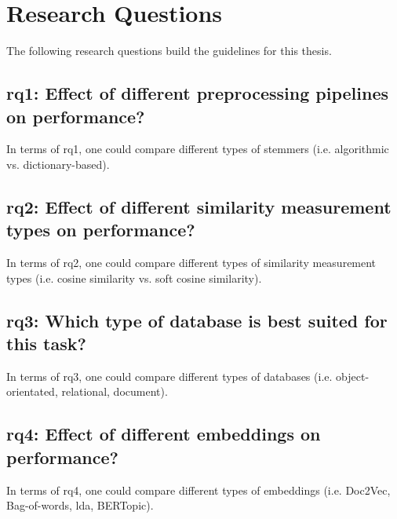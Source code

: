 \section{Research Questions}\label{sec:research-questions}
The following research questions build the guidelines for this thesis.

\subsection[\acs{rq}1]{\ac{rq}1: Effect of different preprocessing pipelines on performance?}\label{subsec:rq1}
In terms of \ac{rq}1, one could compare different types of stemmers (i.e. algorithmic vs. dictionary-based).

\subsection[\acs{rq}2]{\ac{rq}2: Effect of different similarity measurement types on performance?}\label{subsec:rq2}
In terms of \ac{rq}2, one could compare different types of similarity measurement types (i.e. cosine similarity vs. soft cosine similarity).

\subsection[\acs{rq}3]{\ac{rq}3: Which type of database is best suited for this task?}\label{subsec:rq3}
In terms of \ac{rq}3, one could compare different types of databases (i.e. object-orientated, relational, document).

\subsection[\acs{rq}4]{\ac{rq}4: Effect of different embeddings on performance?}\label{subsec:rq4}
In terms of \ac{rq}4, one could compare different types of embeddings (i.e. Doc2Vec, Bag-of-words, \ac{lda}, BERTopic).